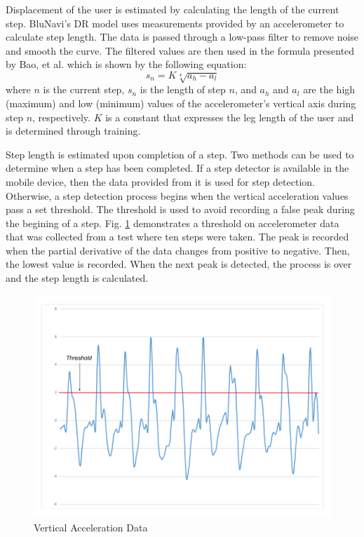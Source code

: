 \documentclass[conference]{IEEEtran}
\begin{document}
Displacement of the user is estimated by calculating the length of the current step. BluNavi's DR model uses measurements provided by an accelerometer to calculate step length. The data is passed through a low-pass filter to remove noise and smooth the curve. The filtered values are then used in the formula presented by Bao, et al. \cite{bao2013indoor} which is shown by the following equation:
\begin{equation}
\label{equa:steplength}
s_n = K\sqrt[4]{a_h - a_l}
\end{equation}
where $n$ is the current step, $s_n$ is the length of step $n$, and $a_h$ and $a_l$ are the high (maximum) and low (minimum) values of the accelerometer's vertical axis during step $n$, respectively. $K$ is a constant that expresses the leg length of the user and is determined through training.

Step length is estimated upon completion of a step. Two methods can be used to determine when a step has been completed. If a step detector is available in the mobile device, then the data provided from it is used for step detection. Otherwise, a step detection process begins when the vertical acceleration values pass a set threshold. The threshold is used to avoid recording a false peak during the begining of a step. Fig. \ref{fig:accgraph} demonstrates a threshold on accelerometer data that was collected from a test where ten steps were taken. The peak is recorded when the partial derivative of the data changes from positive to negative. Then, the lowest value is recorded. When the next peak is detected, the process is over and the step length is calculated.

\begin{figure}[h]
\centering
\includegraphics[scale=0.25]{AccelerometerGraph.png}
\caption{Vertical Acceleration Data}
\captionsetup{justification=centering,margin=2cm}
\label{fig:accgraph}
\end{figure}
\end{document}
